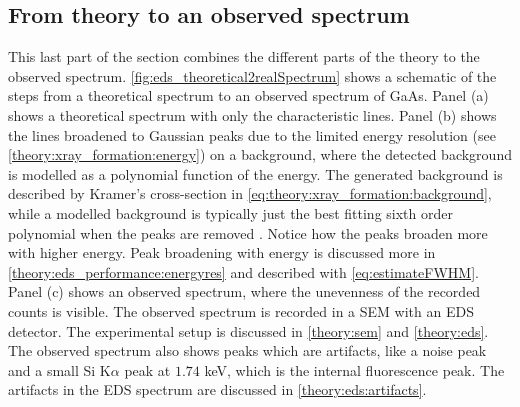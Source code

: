 \subsection{From theory to an observed spectrum}
\label{theory:eds:fromtheorytoreal}

This last part of the section combines the different parts of the theory to the observed spectrum.
\cref{fig:eds_theoretical2realSpectrum} shows a schematic of the steps from a theoretical spectrum to an observed spectrum of GaAs.
Panel (a) shows a theoretical spectrum with only the characteristic lines.
Panel (b) shows the lines broadened to Gaussian peaks due to the limited energy resolution (see \cref{theory:xray_formation:energy}) on a background, where the detected background is modelled as a polynomial function of the energy.
The generated background is described by Kramer's cross-section in \cref{eq:theory:xray_formation:background}, while a modelled background is typically just the best fitting sixth order polynomial when the peaks are removed \cite{hyperspy_1.7.1}.
Notice how the peaks broaden more with higher energy.
Peak broadening with energy is discussed more in \cref{theory:eds_performance:energyres} and described with \cref{eq:estimateFWHM}.
Panel (c) shows an observed spectrum, where the unevenness of the recorded counts is visible.
The observed spectrum is recorded in a SEM with an EDS detector.
The experimental setup is discussed in \cref{theory:sem} and \cref{theory:eds}.
The observed spectrum also shows peaks which are artifacts, like a noise peak and a small Si K$\alpha$ peak at $1.74$ keV, which is the internal fluorescence peak.
The artifacts in the EDS spectrum are discussed in \cref{theory:eds:artifacts}.


